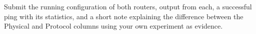 \begin{labdeliverable}
Submit the running configuration of both routers,  output from each, a successful ping with its statistics, and a short note explaining the difference between the Physical and Protocol columns using your own  experiment as evidence.
\end{labdeliverable}
